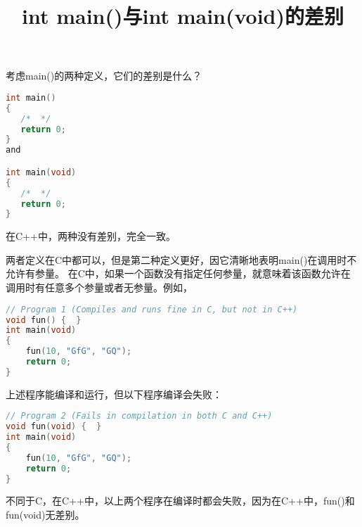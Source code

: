 \documentclass[10pt,a4paper%
tablecaptionabove]{article}
\begin{document}
\begin{CJK}{UTF8}{gkai}


 

\newtheorem{li}{例}
\newtheorem{jielun}{结论}
\newtheorem{dingli}{定理}
\newtheorem{mingti}{{命题}} 
\newtheorem{yinli}{{引理}} 
\newtheorem{tuilun}{{推论}}
\newtheorem{dingyi}{{定义}} 
\newtheorem{example}{{例}}
\newtheorem*{example*}{{例}}
\newtheorem*{jie}{{解}}
\newtheorem*{zhengming}{{证明}}
\newtheorem{zhu}{{注}}
\newtheorem*{zhu*}{{注}}
\newtheorem{xingzhi}{{性质}}
\newtheorem{wenti}{{问题}}
\newtheorem{rem}{{Remark}}
\newtheorem{lem}{{Lemma}}
\pagestyle{plain}




\title{int main()与int main(void)的差别}
\maketitle

考虑main()的两种定义，它们的差别是什么？
\begin{lstlisting}[language=c,frame=single]
int main()
{
   /*  */
   return 0;
}
and

int main(void)
{
   /*  */
   return 0;
}
\end{lstlisting}

在C++中，两种没有差别，完全一致。

两者定义在C中都可以，但是第二种定义更好，因它清晰地表明main()在调用时不允许有参量。
在C中，如果一个函数没有指定任何参量，就意味着该函数允许在调用时有任意多个参量或者无参量。例如，
\begin{lstlisting}[language=c,frame=single]
// Program 1 (Compiles and runs fine in C, but not in C++)
void fun() {  } 
int main(void)
{
    fun(10, "GfG", "GQ");
    return 0;
}
\end{lstlisting}
上述程序能编译和运行，但以下程序编译会失败：
\begin{lstlisting}[language=c,frame=single]
// Program 2 (Fails in compilation in both C and C++)
void fun(void) {  }
int main(void)
{
    fun(10, "GfG", "GQ");
    return 0;
}
\end{lstlisting}
不同于C，在C++中，以上两个程序在编译时都会失败，因为在C++中，fun()和fun(void)无差别。


\end{CJK}
\end{document}
